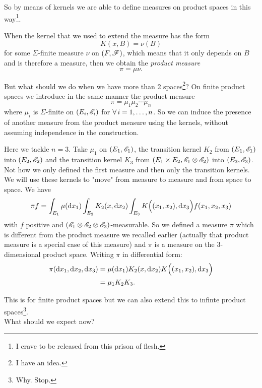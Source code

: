 \documentclass{report}
\begin{document}
So by means of kernels we are able to define measures on product spaces in this way\footnote{I crave to be released from this prison of flesh.}.
\begin{remark}
	When the kernel that we used to extend the measure has the form 
	\[K(x,B)=\nu(B)\]
	for some $\Sigma$-finite measure $\nu$ on $(F,\mathscr{F})$, which means that it only depends on $B$ and is therefore a measure, then we obtain the \emph{product measure}
	\[\pi=\mu\nu.\]
\end{remark}
But what should we do when we have more than 2 spaces\footnote{I have an idea.}? On finite product spaces we introduce in the same manner the product measure 
\[\pi=\mu_1\mu_2\cdots\mu_n\]
where $\mu_i$ is $\Sigma$-finite on $(E_i,\mathscr{E}_i)$ for $\forall\, i=1,\ldots,n$.
So we can induce the presence of another measure from the product measure using the kernels, without assuming independence in the construction.
\begin{example}
	Here we tackle $n=3$. Take $\mu_1$ on $(E_1,\mathscr{E}_1)$, the transition kernel $K_2$ from $(E_1,\mathscr{E}_1)$ into $(E_2,\mathscr{E}_2)$ and the transition kernel $K_3$ from $(E_1\times E_2,\mathscr{E}_1\otimes\mathscr{E}_2)$ into $(E_3,\mathscr{E}_3)$. Not how we only defined the first measure and then only the transition kernels. We will use these kernels to "move" from measure to measure and from space to space. We have
	\[\pi f=\int_{E_1}\mu(\mathop{}\!\mathrm{d} x_1)\int_{E_2}K_2(x,\mathop{}\!\mathrm{d} x_2)\int_{E_3}K\Big((x_1,x_2),\mathop{}\!\mathrm{d} x_3\Big)f(x_1,x_2,x_3)\]
	with $f$ positive and $(\mathscr{E}_1\otimes\mathscr{E}_2\otimes\mathscr{E}_3)$-measurable. So we defined a measure $\pi$ which is different from the product measure we recalled earlier (actually that product measure is a special case of this measure) and $\pi$ is a measure on the 3-dimensional product space. Writing $\pi$ in differential form:
	\begin{align*}
		\pi(\mathop{}\!\mathrm{d} x_1,\mathop{}\!\mathrm{d} x_2,\mathop{}\!\mathrm{d} x_3)&=\mu(\mathop{}\!\mathrm{d} x_1)K_2(x,\mathop{}\!\mathrm{d} x_2)K\Big((x_1,x_2),\mathop{}\!\mathrm{d} x_3\Big)\\
		&=\mu_1K_2K_3.
	\end{align*}
\end{example}
This is for finite product spaces but we can also extend this to infinte product spaces\footnote{Why. Stop.}.\\
What should we expect now?
\end{document}
